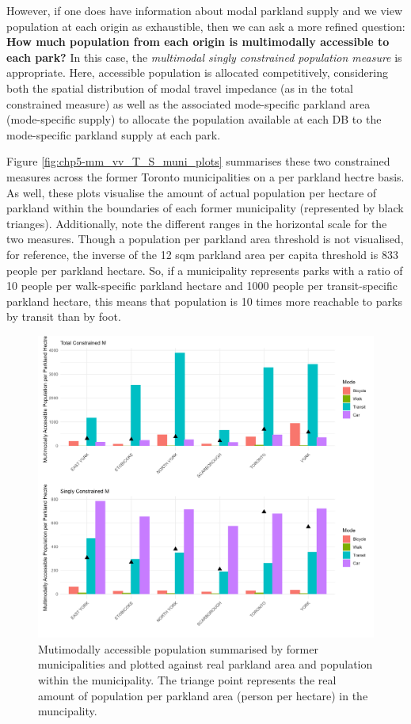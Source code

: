 \documentclass[
11pt, %
oneside, %
english, %
singlespacing, %
]{macthesis} %
\begin{document}
However, if one does have information about modal parkland supply and we view population at each origin as exhaustible, then we can ask a more refined question: \textbf{How much population from each origin is multimodally accessible to each park?} In this case, the \emph{multimodal singly constrained population measure} is appropriate. Here, accessible population is allocated competitively, considering both the spatial distribution of modal travel impedance (as in the total constrained measure) as well as the associated mode-specific parkland area (mode-specific supply) to allocate the population available at each DB to the mode-specific parkland supply at each park.

Figure \ref{fig:chp5-mm_vv_T_S_muni_plots} summarises these two constrained measures across the former Toronto municipalities on a per parkland hectre basis. As well, these plots visualise the amount of actual population per hectare of parkland within the boundaries of each former municipality (represented by black trianges). Additionally, note the different ranges in the horizontal scale for the two measures. Though a population per parkland area threshold is not visualised, for reference, the inverse of the 12 sqm parkland area per capita threshold is 833 people per parkland hectare. So, if a municipality represents parks with a ratio of 10 people per walk-specific parkland hectare and 1000 people per transit-specific parkland hectare, this means that population is 10 times more reachable to parks by transit than by foot.

\begin{figure}

{\centering \includegraphics[width=6in]{./data/figures/chp5-mm_mm_T_S_muni_plots} 

}

\caption{\label{fig:chp5-mm_vv_T_S_muni_plots} Mutimodally accessible population summarised by former municipalities and plotted against real parkland area and population within the municipality. The triange point represents the real amount of population per parkland area (person per hectare) in the muncipality.}\label{fig:unnamed-chunk-91}
\end{figure}
\end{document}

